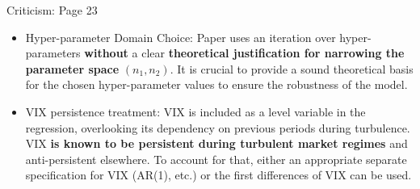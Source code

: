 \documentclass{beamer}
\begin{document}
\begin{frame}{Criticism: Page 23}
    \begin{itemize}
        
        \item Hyper-parameter Domain Choice: Paper uses an iteration over hyper-parameters \textbf{without} a clear \textbf{theoretical justification for narrowing the parameter space} $(n_1, n_2)$. It is crucial to provide a sound theoretical basis for the chosen hyper-parameter values to ensure the robustness of the model.
        
        \item VIX persistence treatment: VIX is included as a level variable in the regression, overlooking its dependency on previous periods during turbulence. VIX \textbf{is known to be persistent during turbulent market regimes} and anti-persistent elsewhere. To account for that, either an appropriate separate specification for VIX (AR(1), etc.) or the first differences of VIX can be used.
    \end{itemize}
\end{frame}
\end{document}
